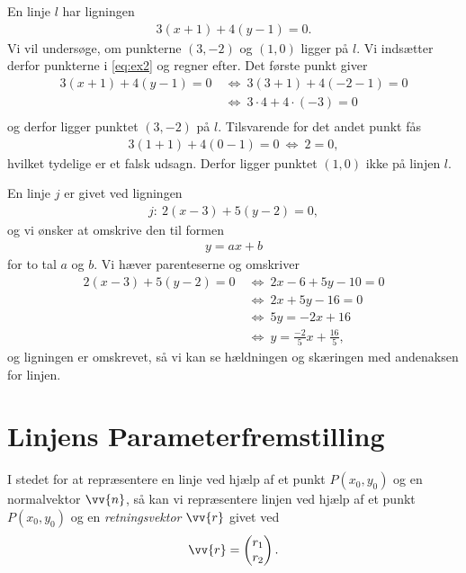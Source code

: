 \begin{exa}
En linje $l$ har ligningen 
\begin{align}\label{eq:ex2}
	3(x+1) + 4(y-1) = 0.
\end{align}
Vi vil undersøge, om punkterne $(3,-2)$ og $(1,0)$ ligger på $l$. Vi indsætter derfor punkterne i \eqref{eq:ex2} og regner efter. Det første punkt giver
\begin{align*}
3(x+1) + 4(y-1) = 0 \ &\Leftrightarrow \  3(3+1) + 4(-2-1) = 0 \\
& \Leftrightarrow \ 3\cdot 4+4\cdot(-3) = 0\\
\end{align*}
og derfor ligger punktet $(3,-2)$ på $l$. Tilsvarende for det andet punkt fås
\begin{align*}
3(1+1) + 4(0-1) = 0 \  \Leftrightarrow \ 2 = 0, 
\end{align*}
hvilket tydelige er et falsk udsagn. Derfor ligger punktet $(1,0)$ ikke på linjen $l$. 
\end{exa}
\begin{exa}
	En linje $j$ er givet ved ligningen
	\begin{align*}
		j:\ 2(x-3) + 5(y-2) = 0,
	\end{align*}
	og vi ønsker at omskrive den til formen
	\begin{align*}
		y = ax + b
	\end{align*}
	for to tal $a$ og $b$. Vi hæver parenteserne og omskriver
	\begin{align*}
		2(x-3) + 5(y-2) = 0 \ &\Leftrightarrow \ 2x - 6 + 5y - 10 = 0\\
		&\Leftrightarrow	\ 2x + 5y - 16 = 0 \\
		&\Leftrightarrow \ 5y = -2x + 16 \\
		&\Leftrightarrow \ y = \frac{-2}{5}x + \frac{16}{5},
	\end{align*}
	og ligningen er omskrevet, så vi kan se hældningen og skæringen med andenaksen for linjen. 
\end{exa}



\section*{Linjens Parameterfremstilling}

I stedet for at repræsentere en linje ved hjælp af et punkt $P(x_0,y_0)$ og en normalvektor $\vv{n}$, så kan vi repræsentere linjen ved hjælp af et punkt $P(x_0,y_0)$ og en \textit{retningsvektor} $\vv{r}$ givet ved 
\begin{align*}
	\vv{r} = 	
	\begin{pmatrix}
 		r_1 \\ r_2
	\end{pmatrix}.
\end{align*}

